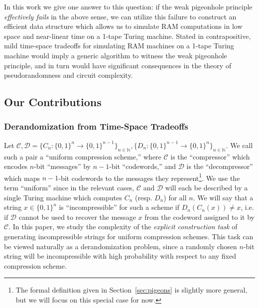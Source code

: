 \documentclass[11pt]{article}
\newcommand{\todo}[1]{\textcolor{red}{TODO: #1}}
\newcommand{\B}{\{0,1\}}
\def\cl{\bf}
\begin{document}
In this work we give one answer to this question: if the weak pigeonhole principle \emph{effectively fails} in the above sense, we can utilize this failure to construct an efficient data structure which allows us to simulate RAM computations in low space and near-linear time on a 1-tape Turing machine.
Stated in contrapositive, mild time-space tradeoffs for simulating RAM machines on a 1-tape Turing machine would imply a generic algorithm to witness the weak pigeonhole principle, and in turn would have significant consequences in the theory of pseudorandomness and circuit complexity. 

\subsection{Our Contributions}\label{subsec:contr}
\subsubsection{Derandomization from Time-Space Tradeoffs}
Let $\mathcal{C}, \mathcal{D} = \{C_n\colon \B^{n} \rightarrow \B^{n-1}\}_{n \in \mathbb{N}}, \{D_n\colon \B^{n-1} \rightarrow \B^{n}\}_{n \in \mathbb{N}}$. We call such a pair a ``uniform compression scheme,'' where $\mathcal{C}$ is the ``compressor'' which encodes $n$-bit ``messages'' by $n-1$-bit ``codewords,'' and $\mathcal{D}$ is the ``decompressor'' which maps $n-1$-bit codewords to the messages they represent\footnote{The formal definition given in Section~\ref{sec:pigeons} is slightly more general, but we will focus on this special case for now.}. We use the term ``uniform'' since in the relevant cases, $\mathcal{C}$ and $\mathcal{D}$ will each be described by a single Turing machine which computes $C_n$ (resp. $D_n$) for all $n$. We will say that a string $x \in \B^n$ is ``incompressible'' for such a scheme if $D_n(C_n(x)) \neq x$, i.e. if $\mathcal{D}$ cannot be used to recover the message $x$ from the codeword assigned to it by $\mathcal{C}$. In this paper, we study the complexity of the \emph{explicit construction task} of generating incompressible strings for uniform compression schemes. This task can be viewed naturally as a derandomization problem, since a randomly chosen $n$-bit string will be incompressible with high probability with respect to any fixed compression scheme.
\end{document}
